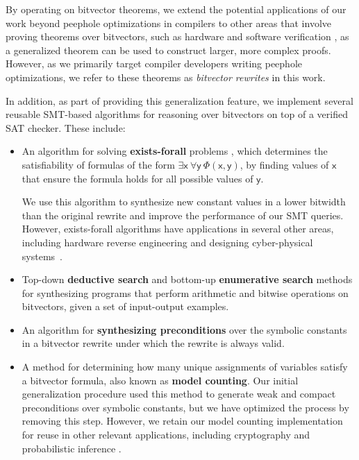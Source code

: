 \documentclass[review, anonymous, acmsmall]{acmart}
\newcommand{\inline}[1]{$\mathsf{#1}$}
\begin{document}
By operating on bitvector theorems, we extend the potential applications of our work beyond peephole optimizations in compilers to other areas that involve proving theorems over bitvectors, such as hardware and software verification \cite{hadarean_fine_2015}, as a generalized theorem can be used to construct larger, more complex proofs. However, as we primarily target compiler developers writing peephole optimizations, we refer to these theorems as \textit{bitvector rewrites} in this work.

In addition, as part of providing this generalization feature, we implement several reusable SMT-based algorithms for reasoning over bitvectors on top of a verified SAT checker. These include:  
\begin{itemize}
    \item An algorithm for solving \textbf{exists-forall} problems \cite{dutertre_solving_2015}, which determines the satisfiability of formulas of the form \inline{\exists x\ \forall y\ \Phi(x, y)}, by finding values of \inline{x} that ensure the formula holds for all possible values of \inline{y}. 
    
    We use this algorithm to synthesize new constant values in a lower bitwidth than the original rewrite and improve the performance of our SMT queries. However, exists-forall algorithms have applications in several other areas, including hardware reverse engineering \cite{gascon_template-based_2014} and designing cyber-physical systems~\cite{cheng_efsmt_2013}. 
  

    \item Top-down \textbf{deductive search} and bottom-up \textbf{enumerative search} methods for synthesizing programs that perform arithmetic and bitwise operations on bitvectors, given a set of input-output examples. 
    
    \item  An algorithm for \textbf{synthesizing preconditions} over the symbolic constants in a bitvector rewrite under which the rewrite is always valid. 
    \item A method for determining how many unique assignments of variables satisfy a bitvector formula, also known as \textbf{model counting}. Our initial generalization procedure used this method to generate weak and compact preconditions over symbolic constants, but we have optimized the process by removing this step. However, we retain our model counting implementation for reuse in other relevant applications, including cryptography \cite{beck_automating_2020} and probabilistic inference \cite{sang_performing_2005}. 
\end{itemize}
\end{document}
